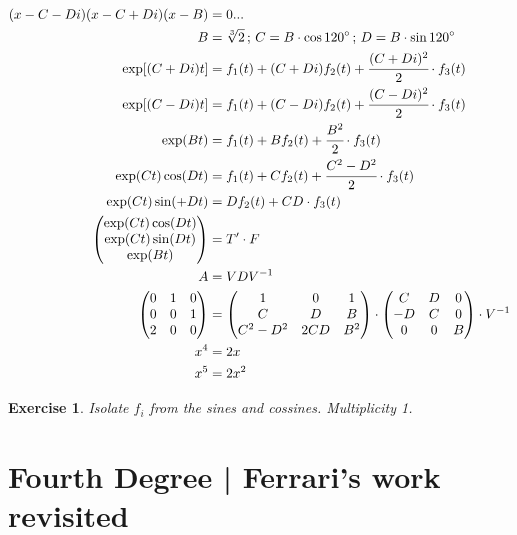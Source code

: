 \documentclass[12pt,a4paper]{article}
\newtheorem{exercise}{Exercise}[section]
\begin{document}
\begin{align}
(x - C - Di)(x - C + Di)(x - B) &= 0... \\
B &= \sqrt[3]{2}\,;\,C = B\cdot \cos 120\degree\,;\,D = B\cdot\sin 120\degree \\
\exp [(C + Di)t] &= f_1(t) + (C + Di) f_2(t) + \cfrac{(C + Di)^2}{2}\cdot f_3(t) \\
\exp [(C - Di)t] &= f_1(t) + (C - Di) f_2(t) + \cfrac{(C - Di)^2}{2}\cdot f_3(t) \\
\exp (Bt) &= f_1(t) + B f_2(t) + \cfrac{B^2}{2}\cdot f_3(t) \\
\exp (Ct) \cos (Dt) &= f_1(t) + C f_2(t) + \cfrac{C^2 - D^2}{2}\cdot f_3(t) \\
\exp (Ct) \sin (+ Dt) &= D f_2(t) + CD\cdot f_3(t) \\
\begin{pmatrix} \exp (Ct) \cos (Dt) \\ \exp (Ct) \sin (Dt) \\ \exp (Bt)  \end{pmatrix} &= T' \cdot F  \\
A &= VDV^{-1} \\
\left( \begin{matrix} 0 & 1 & 0 \\ 0 & 0 & 1 \\ 2 & 0 & 0 \end{matrix} \right)
&=
\left( \begin{matrix}  1 & 0 & 1 \\ C & D & B \\ C^2 - D^2 & 2CD & B^2  \end{matrix} \right) \cdot
\left( \begin{matrix} C & D & 0 \\ -D & C & 0 \\ 0 & 0 & B  \end{matrix} \right) \cdot V^{-1} \\
x^4 &= 2x \\
x^5 &= 2x^2
\end{align}

\begin{exercise}
Isolate $f_i$ from the sines and cossines. Multiplicity 1.
\end{exercise}

\section{Fourth Degree | Ferrari's work revisited}
\end{document}
